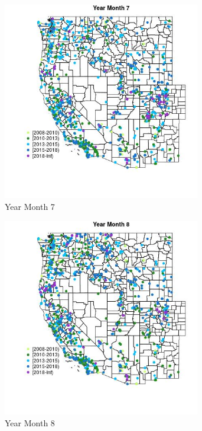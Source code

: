 \begin{figure} 
\centering  
\includegraphics[width=0.77\textwidth]{Code_Outputs/Report_ML_input_PM25_Step4_part_e_de_duplicated_aveswNAs_MapObsMo7Year.jpg} 
\caption{\label{fig:Report_ML_input_PM25_Step4_part_e_de_duplicated_aveswNAsMapObsMo7Year}Year Month 7} 
\end{figure} 
 

\begin{figure} 
\centering  
\includegraphics[width=0.77\textwidth]{Code_Outputs/Report_ML_input_PM25_Step4_part_e_de_duplicated_aveswNAs_MapObsMo8Year.jpg} 
\caption{\label{fig:Report_ML_input_PM25_Step4_part_e_de_duplicated_aveswNAsMapObsMo8Year}Year Month 8} 
\end{figure} 
 

